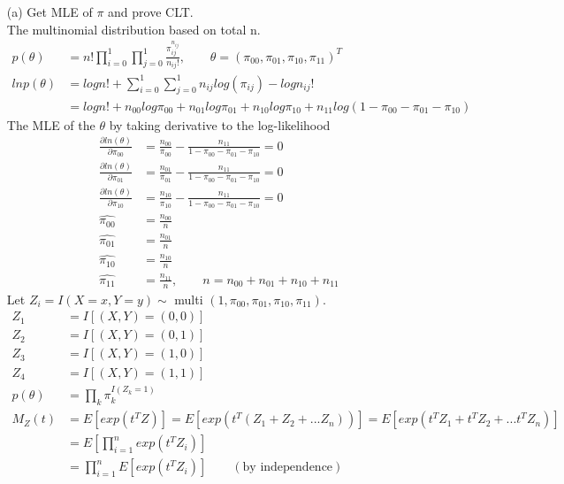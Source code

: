 \begin{itemize}
	\item [(a)] Get MLE of $\pi$ and prove CLT.\\
	The multinomial distribution based on total n. 
	\begin{align*}
		p(\theta) &=n! \prod_{i=0}^1 \prod_{j=0}^1  \frac{\pi_{ij}^{n_{ij}}}{n_{ij}!}, \qquad \theta = (\pi_{00}, \pi_{01}, \pi_{10}, \pi_{11})^T\\
		ln p(\theta) &=log n!+ \sum_{i=0}^1 \sum_{j=0}^1 n_{ij}log( \pi_{ij}) - log n_{ij}! \\
		&= log n!+ n_{00}log \pi_{00}  + n_{01}log \pi_{01}  + n_{10}log \pi_{10}  + n_{11}log (1-\pi_{00}-\pi_{01} - \pi_{10})  
	\end{align*}
	The MLE of the $\theta$ by taking derivative to the log-likelihood
	\begin{align*}
		\frac{\partial ln(\theta)}{\partial \pi_{00}} &= \frac{n_{00}}{\pi_{00}} - \frac{n_{11}}{1-\pi_{00}-\pi_{01}-\pi_{10}} = 0\\  
		\frac{\partial ln(\theta)}{\partial \pi_{01}} &=\frac{n_{01}}{\pi_{01}} - \frac{n_{11}}{1-\pi_{00}-\pi_{01}-\pi_{10}} = 0 \\  
		\frac{\partial ln(\theta)}{\partial \pi_{10}} &= \frac{n_{10}}{\pi_{10}} - \frac{n_{11}}{1-\pi_{00}-\pi_{01}-\pi_{10}} = 0\\ 
		\hat{\pi_{00}} & = \frac{n_{00}}{n}\\
		\hat{\pi_{01}} & = \frac{n_{01}}{n}\\
		\hat{\pi_{10}} & = \frac{n_{10}}{n}\\
		\hat{\pi_{11}} & = \frac{n_{11}}{n}, \qquad n= n_{00} + n_{01} + n_{10} + n_{11}
	\end{align*}
	Let $Z_i= I(X=x, Y=y) \sim $ multi $(1, \pi_{00}, \pi_{01}, \pi_{10}, \pi_{11})$.
	\begin{align*}
		Z_1 &= I[(X,Y)= (0,0)]\\
		Z_2 &= I[(X,Y)= (0,1)]\\
		Z_3 &= I[(X,Y)= (1,0)]\\
		Z_4 &= I[(X,Y)= (1,1)]\\
		p(\theta) &= \prod_k \pi_{k}^{I(Z_k=1)}\\
		M_Z(t) &= E[exp(t^TZ)] = E[exp(t^T(Z_1 + Z_2 +... Z_n))] = E[exp(t^TZ_1 + t^TZ_2 + ... t^TZ_n)]\\
		&= E[\prod_{i=1}^n exp(t^TZ_i)]\\
		&= \prod_{i=1}^n E[exp(t^TZ_i)]  \qquad (\text{by independence})\\

\end{align*}
\end{itemize}
